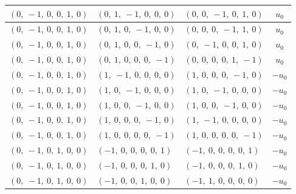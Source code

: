 \documentclass[11pt]{article}
\theoremstyle{definition}
\begin{document}
\begin{longtable}{|l|l|l|c|}
    \hline
    $\left( 0, \  -1, \  0, \  0, \  1, \  0\right)$ & $\left( 0, \  1, \  -1, \  0, \  0, \  0\right)$ & $\left( 0, \  0, \  -1, \  0, \  1, \  0\right)$ & $u_{0}$ \\
    \hline
    $\left( 0, \  -1, \  0, \  0, \  1, \  0\right)$ & $\left( 0, \  1, \  0, \  -1, \  0, \  0\right)$ & $\left( 0, \  0, \  0, \  -1, \  1, \  0\right)$ & $u_{0}$ \\
    \hline
    $\left( 0, \  -1, \  0, \  0, \  1, \  0\right)$ & $\left( 0, \  1, \  0, \  0, \  -1, \  0\right)$ & $\left( 0, \  -1, \  0, \  0, \  1, \  0\right)$ & $u_{0}$ \\
    \hline
    $\left( 0, \  -1, \  0, \  0, \  1, \  0\right)$ & $\left( 0, \  1, \  0, \  0, \  0, \  -1\right)$ & $\left( 0, \  0, \  0, \  0, \  1, \  -1\right)$ & $u_{0}$ \\
    \hline
    $\left( 0, \  -1, \  0, \  0, \  1, \  0\right)$ & $\left( 1, \  -1, \  0, \  0, \  0, \  0\right)$ & $\left( 1, \  0, \  0, \  0, \  -1, \  0\right)$ & $- u_{0}$ \\
    \hline
    $\left( 0, \  -1, \  0, \  0, \  1, \  0\right)$ & $\left( 1, \  0, \  -1, \  0, \  0, \  0\right)$ & $\left( 1, \  0, \  -1, \  0, \  0, \  0\right)$ & $- u_{0}$ \\
    \hline
    $\left( 0, \  -1, \  0, \  0, \  1, \  0\right)$ & $\left( 1, \  0, \  0, \  -1, \  0, \  0\right)$ & $\left( 1, \  0, \  0, \  -1, \  0, \  0\right)$ & $- u_{0}$ \\
    \hline
    $\left( 0, \  -1, \  0, \  0, \  1, \  0\right)$ & $\left( 1, \  0, \  0, \  0, \  -1, \  0\right)$ & $\left( 1, \  -1, \  0, \  0, \  0, \  0\right)$ & $- u_{0}$ \\
    \hline
    $\left( 0, \  -1, \  0, \  0, \  1, \  0\right)$ & $\left( 1, \  0, \  0, \  0, \  0, \  -1\right)$ & $\left( 1, \  0, \  0, \  0, \  0, \  -1\right)$ & $- u_{0}$ \\
    \hline
    $\left( 0, \  -1, \  0, \  1, \  0, \  0\right)$ & $\left( -1, \  0, \  0, \  0, \  0, \  1\right)$ & $\left( -1, \  0, \  0, \  0, \  0, \  1\right)$ & $- u_{0}$ \\
    \hline
    $\left( 0, \  -1, \  0, \  1, \  0, \  0\right)$ & $\left( -1, \  0, \  0, \  0, \  1, \  0\right)$ & $\left( -1, \  0, \  0, \  0, \  1, \  0\right)$ & $- u_{0}$ \\
    \hline
    $\left( 0, \  -1, \  0, \  1, \  0, \  0\right)$ & $\left( -1, \  0, \  0, \  1, \  0, \  0\right)$ & $\left( -1, \  1, \  0, \  0, \  0, \  0\right)$ & $- u_{0}$ \\

\end{longtable}
\end{document}
